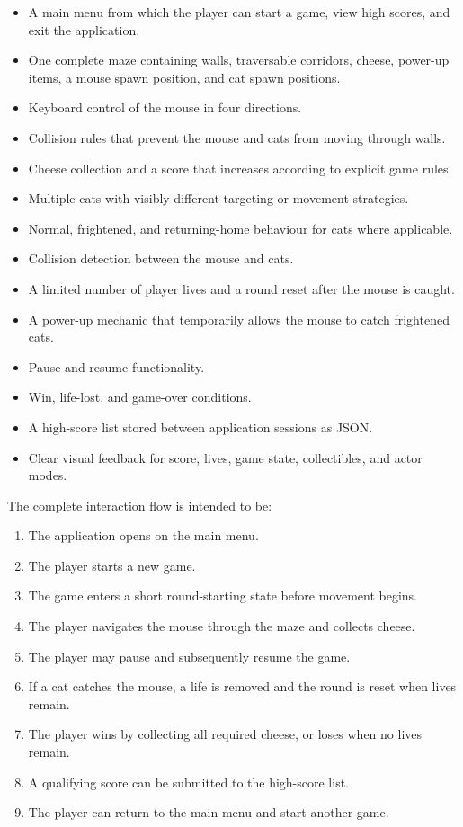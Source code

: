 \begin{itemize}
	\item A main menu from which the player can start a game, view high scores, and exit the application.
	\item One complete maze containing walls, traversable corridors, cheese, power-up items, a mouse spawn position, and cat spawn positions.
	\item Keyboard control of the mouse in four directions.
	\item Collision rules that prevent the mouse and cats from moving through walls.
	\item Cheese collection and a score that increases according to explicit game rules.
	\item Multiple cats with visibly different targeting or movement strategies.
	\item Normal, frightened, and returning-home behaviour for cats where applicable.
	\item Collision detection between the mouse and cats.
	\item A limited number of player lives and a round reset after the mouse is caught.
	\item A power-up mechanic that temporarily allows the mouse to catch frightened cats.
	\item Pause and resume functionality.
	\item Win, life-lost, and game-over conditions.
	\item A high-score list stored between application sessions as JSON.
	\item Clear visual feedback for score, lives, game state, collectibles, and actor modes.
\end{itemize}

The complete interaction flow is intended to be:

\begin{enumerate}
	\item The application opens on the main menu.
	\item The player starts a new game.
	\item The game enters a short round-starting state before movement begins.
	\item The player navigates the mouse through the maze and collects cheese.
	\item The player may pause and subsequently resume the game.
	\item If a cat catches the mouse, a life is removed and the round is reset when lives remain.
	\item The player wins by collecting all required cheese, or loses when no lives remain.
	\item A qualifying score can be submitted to the high-score list.
	\item The player can return to the main menu and start another game.
\end{enumerate}

